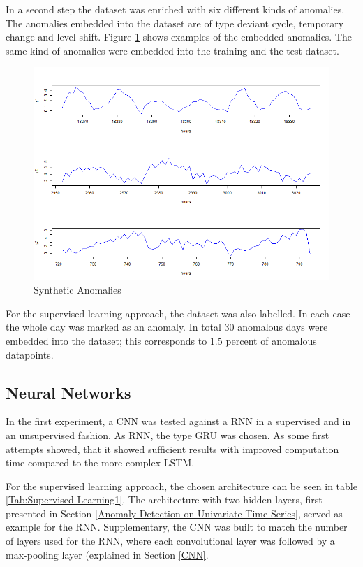 In a second step the dataset was enriched with six different kinds of anomalies. The anomalies embedded into the dataset are of type deviant cycle, temporary change and level shift. Figure \ref{fig:anomalies} shows examples of the embedded anomalies. The same kind of anomalies were embedded into the training and the test dataset.

\begin{figure}[h]
	\centering
	\includegraphics[scale=0.7]{Figures/Anomalies}
	\decoRule
	\caption[Synthetic Anomalies]{Synthetic Anomalies \parencite{own}}
	\label{fig:anomalies}
\end{figure}

For the supervised learning approach, the dataset was also labelled. In each case the whole day was marked as an anomaly. In total 30 anomalous days were embedded into the dataset; this corresponds to 1.5 percent of anomalous datapoints.

\subsection{Neural Networks}
In the first experiment, a CNN was tested against a RNN in a supervised and in an unsupervised fashion. As RNN, the type GRU was chosen. As some first attempts showed, that it showed sufficient results with improved computation time compared to the more complex LSTM. 

For the supervised learning approach, the chosen architecture can be seen in table \ref{Tab:Supervised Learning1}. The architecture with two hidden layers, first presented in Section \ref{Anomaly Detection on Univariate Time Series}, served as example for the RNN. Supplementary, the CNN was built to match the number of layers used for the RNN, where each convolutional layer was followed by a max-pooling layer (explained in Section \ref{CNN}.     

